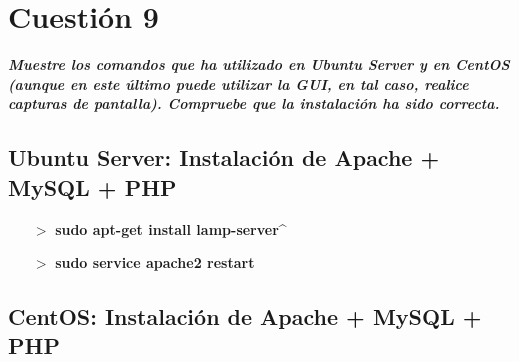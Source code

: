 \newpage

\section{Cuestión 9}
\textbf{\textit{Muestre los comandos que ha utilizado en Ubuntu Server y en
	CentOS (aunque en este último puede utilizar la GUI, en tal caso, realice
	capturas de pantalla). Compruebe que la instalación ha sido correcta.}}

\subsection{Ubuntu Server: Instalación de Apache + MySQL + PHP} \cite{enlace22}
\begin{enumerate}
	\item [$>$] \textbf{sudo apt-get install lamp-server\^}
	\item [$>$] \textbf{sudo service apache2 restart} 
\end{enumerate}

\subsection{CentOS: Instalación de Apache + MySQL + PHP} \cite{enlace23}

